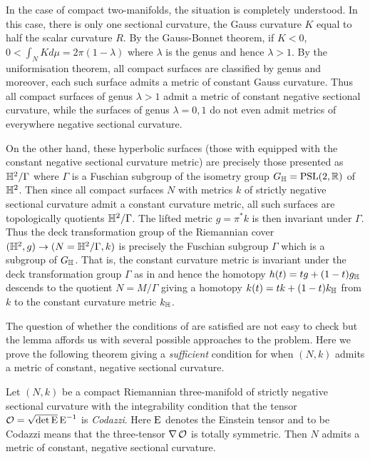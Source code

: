 \documentclass[a4paper, 12pt]{amsart}
\begin{document}
\begin{rem}
In the case of compact two-manifolds, the situation is completely understood. In this case, there is only one sectional curvature, the Gauss curvature \(K\) equal to half the scalar curvature \(R\). By the Gauss-Bonnet theorem, if \(K < 0\), \(0 < \int_N K d\mu = 2\pi(1-\lambda)\) where \(\lambda\) is the genus and hence \(\lambda > 1\). By the uniformisation theorem, all compact surfaces are classified by genus and moreover, each such surface admits a metric of constant Gauss curvature. Thus all compact surfaces of genus \(\lambda > 1\) admit a metric of constant negative sectional curvature, while the surfaces of genus \(\lambda = 0, 1\) do not even admit metrics of everywhere negative sectional curvature.

On the other hand, these hyperbolic surfaces (those with equipped with the constant negative sectional curvature metric) are precisely those presented as \(\mathbb{H}^2/\Gamma\) where \(\Gamma\) is a Fuschian subgroup of the isometry group \(G_{\mathbb{H}} = \text{PSL}(2, \mathbb{R})\) of \(\mathbb{H}^2\). Then since all compact surfaces \(N\) with metrics \(k\) of strictly negative sectional curvature admit a constant curvature metric, all such surfaces are topologically quotients \(\mathbb{H}^2/\Gamma\). The lifted metric \(g = \pi^{\ast} k\) is then invariant under \(\Gamma\). Thus the deck transformation group of the Riemannian cover \((\mathbb{H}^2, g) \to (N = \mathbb{H}^2/\Gamma, k)\) is precisely the Fuschian subgroup \(\Gamma\) which is a subgroup of \(G_{\mathbb{H}}\). That is, the constant curvature metric is invariant under the deck transformation group \(\Gamma\) as in  and hence the homotopy \(h(t) = t g + (1-t)g_{\mathbb{H}}\) descends to the quotient \(N = M/\Gamma\) giving a homotopy \(k(t) = t k + (1-t)k_{\mathbb{H}}\) from \(k\) to the constant curvature metric \(k_{\mathbb{H}}\).
\end{rem}

The question of whether the conditions of  are satisfied are not easy to check but the lemma affords us with several possible approaches to the problem. Here we prove the following theorem giving a \emph{sufficient} condition for when \((N, k)\) admits a metric of constant, negative sectional curvature.

\begin{thm}
\label{thm:intg_const_curv}
Let \((N, k)\) be a compact Riemannian three-manifold of strictly negative sectional curvature with the integrability condition that the tensor \(\operatorname{\mathcal{O}} = \sqrt{\det \operatorname{E}} \operatorname{E}^{-1}\) is \emph{Codazzi}. Here \(\operatorname{E}\) denotes the Einstein tensor and to be Codazzi means that the three-tensor \(\nabla \operatorname{\mathcal{O}}\) is totally symmetric. Then \(N\) admits a metric of constant, negative sectional curvature.
\end{thm}
\end{document}

